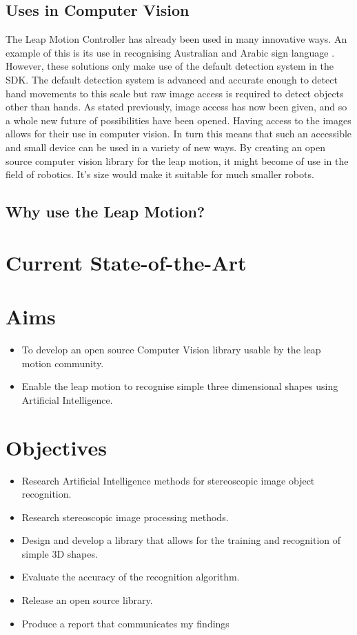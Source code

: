 \documentclass[11pt,oneside]{report}
\begin{document}
			\subsection{Uses in Computer Vision}
				The Leap Motion Controller has already been used in many innovative ways.
				An example of this is its use in recognising Australian and Arabic sign language \cite{journal:leapSignLanguage,journal:leapSignLanguage2}.
				However, these solutions only make use of the default detection system in the SDK.
				The default detection system is advanced and accurate enough to detect hand movements to this scale but raw image access is required to detect objects other than hands.
				As stated previously, image access has now been given, and so a whole new future of possibilities have been opened.
				Having access to the images allows for their use in computer vision.
				In turn this means that such an accessible and small device can be used in a variety of new ways.
				By creating an open source computer vision library for the leap motion, it might become of use in the field of robotics.
				It's size would make it suitable for much smaller robots.
			\subsection{Why use the Leap Motion?}
			
		\section{Current State-of-the-Art}
		\section{Aims} 
		\begin{itemize}
			\item To develop an open source Computer Vision library usable by the leap motion community.
			\item Enable the leap motion to recognise simple three dimensional shapes using Artificial Intelligence.
		\end{itemize}
		\section{Objectives} 
		\begin{itemize}
			\item Research Artificial Intelligence methods for stereoscopic image object recognition.
			\item Research stereoscopic image processing methods.
			\item Design and develop a library that allows for the training and recognition of simple 3D shapes.
			\item Evaluate the accuracy of the recognition algorithm.
			\item Release an open source library.
			\item Produce a report that communicates my findings
		\end{itemize}
\end{document}
